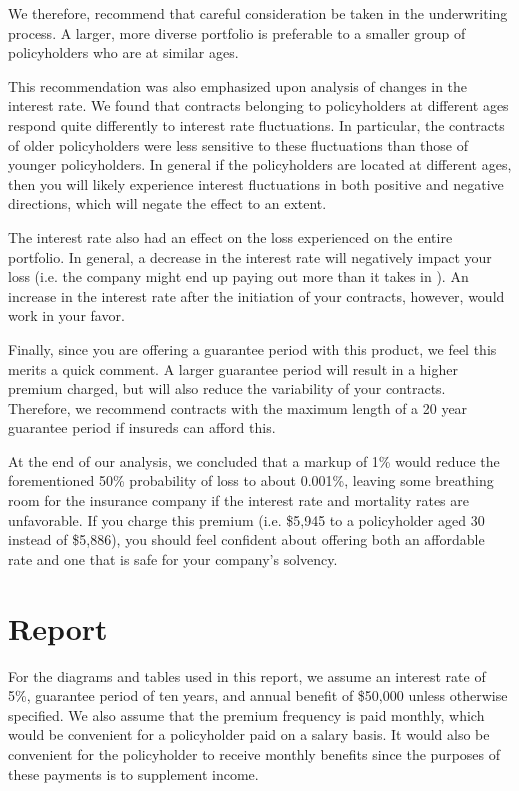 \documentclass[12pt]{article}
\begin{document}
We therefore, recommend that careful consideration be taken in the underwriting process. A larger, more diverse portfolio is preferable to a smaller group of policyholders who are at similar ages.

This recommendation was also emphasized upon analysis of changes in the interest rate. We found that contracts belonging to policyholders at different ages respond quite differently to interest rate fluctuations. In particular, the contracts of older policyholders were less sensitive to these fluctuations than those of younger policyholders. In general if the policyholders are located at different ages, then you will likely experience interest fluctuations in both positive and negative directions, which will negate the effect to an extent.

The interest rate also had an effect on the loss experienced on the entire portfolio. In general, a decrease in the interest rate will negatively impact your loss (i.e. the company might end up paying out more than it takes in ). An increase in the interest rate after the initiation of your contracts, however, would work in your favor.

Finally, since you are offering a guarantee period with this product, we feel this merits a quick comment. A larger guarantee period will result in a higher premium charged, but will also reduce the variability of your contracts. Therefore, we recommend contracts with the maximum length of a 20 year guarantee period if insureds can afford this.

At the end of our analysis, we concluded that a markup of 1\% would reduce the forementioned 50\% probability of loss to about 0.001\%, leaving some breathing room for the insurance company if the interest rate and mortality rates are unfavorable. If you charge this premium (i.e. \$5,945 to a policyholder aged 30 instead of \$5,886), you should feel confident about offering both an affordable rate and one that is safe for your company's solvency.

\section{Report}

For the diagrams and tables used in this report, we assume an interest rate of 5\%, guarantee period of ten years, and annual benefit of \$50,000 unless otherwise specified. We also assume that the premium frequency is paid monthly, which would be convenient for a policyholder paid on a salary basis. It would also be convenient for the policyholder to receive monthly benefits since the purposes of these payments is to supplement income.
\end{document}
